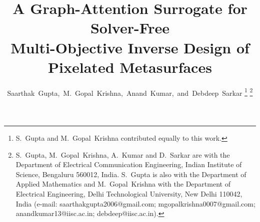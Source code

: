 \documentclass[journal]{IEEEtran}
\begin{document}
\title{A Graph-Attention Surrogate for Solver-Free\\
Multi-Objective Inverse Design of Pixelated Metasurfaces}

\author{Saarthak~Gupta,~M.~Gopal~Krishna,~Anand~Kumar,~and~Debdeep~Sarkar%
\thanks{S.~Gupta and M.~Gopal~Krishna contributed equally to this work.}%
\thanks{S.~Gupta, M.~Gopal~Krishna, A.~Kumar and D.~Sarkar are with the Department of Electrical Communication Engineering, Indian Institute of Science, Bengaluru 560012, India. S.~Gupta is also with the Department of Applied Mathematics and M.~Gopal~Krishna with the Department of Electrical Engineering, Delhi Technological University, New Delhi 110042, India (e-mail: saarthakgupta2006@gmail.com; mgopalkrishna0007@gmail.com; anandkumar13@iisc.ac.in; debdeep@iisc.ac.in).}}


\maketitle
\end{document}
